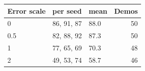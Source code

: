 \begin{tabular}{lllr}
\toprule
Error scale & per seed & mean & Demos \\
\midrule
0 & 86, 91, 87 & 88.0 & 50 \\
0.5 & 82, 88, 92 & 87.3 & 50 \\
1 & 77, 65, 69 & 70.3 & 48 \\
2 & 49, 53, 74 & 58.7 & 46 \\
\bottomrule
\end{tabular}
